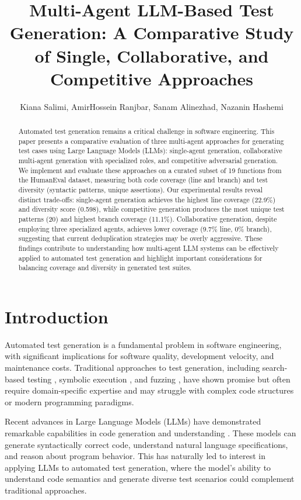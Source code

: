 \documentclass[11pt]{article}
\title{Multi-Agent LLM-Based Test Generation: A Comparative Study of Single, Collaborative, and Competitive Approaches}
\author{Kiana Salimi,
  AmirHossein Ranjbar,
  Sanam Alinezhad,
  Nazanin Hashemi}
\begin{document}
\maketitle
\begin{abstract}
Automated test generation remains a critical challenge in software engineering. This paper presents a comparative evaluation of three multi-agent approaches for generating test cases using Large Language Models (LLMs): single-agent generation, collaborative multi-agent generation with specialized roles, and competitive adversarial generation. We implement and evaluate these approaches on a curated subset of 19 functions from the HumanEval dataset, measuring both code coverage (line and branch) and test diversity (syntactic patterns, unique assertions). Our experimental results reveal distinct trade-offs: single-agent generation achieves the highest line coverage (22.9\%) and diversity score (0.598), while competitive generation produces the most unique test patterns (20) and highest branch coverage (11.1\%). Collaborative generation, despite employing three specialized agents, achieves lower coverage (9.7\% line, 0\% branch), suggesting that current deduplication strategies may be overly aggressive. These findings contribute to understanding how multi-agent LLM systems can be effectively applied to automated test generation and highlight important considerations for balancing coverage and diversity in generated test suites.
\end{abstract}

\section{Introduction}

Automated test generation is a fundamental problem in software engineering, with significant implications for software quality, development velocity, and maintenance costs. Traditional approaches to test generation, including search-based testing \cite{McMinn2004}, symbolic execution \cite{Cadar2008}, and fuzzing \cite{Manes2019}, have shown promise but often require domain-specific expertise and may struggle with complex code structures or modern programming paradigms.

Recent advances in Large Language Models (LLMs) have demonstrated remarkable capabilities in code generation and understanding \cite{Chen2021}. These models can generate syntactically correct code, understand natural language specifications, and reason about program behavior. This has naturally led to interest in applying LLMs to automated test generation, where the model's ability to understand code semantics and generate diverse test scenarios could complement traditional approaches.
\end{document}
